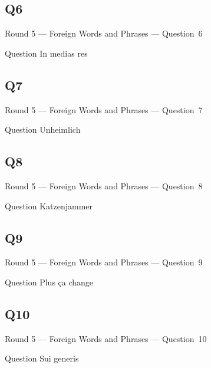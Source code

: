 \documentclass[11pt]{beamer}
\begin{document}
\subsection*{Q6}
\begin{frame}[t]{Round 5 --- Foreign Words and Phrases --- \mbox{Question 6}}
    \vspace{-0.5em}
    \begin{block}{Question}
        In medias res
    \end{block}
\end{frame}
\subsection*{Q7}
\begin{frame}[t]{Round 5 --- Foreign Words and Phrases --- \mbox{Question 7}}
    \vspace{-0.5em}
    \begin{block}{Question}
        Unheimlich
    \end{block}
\end{frame}
\subsection*{Q8}
\begin{frame}[t]{Round 5 --- Foreign Words and Phrases --- \mbox{Question 8}}
    \vspace{-0.5em}
    \begin{block}{Question}
        Katzenjammer
    \end{block}
\end{frame}
\subsection*{Q9}
\begin{frame}[t]{Round 5 --- Foreign Words and Phrases --- \mbox{Question 9}}
    \vspace{-0.5em}
    \begin{block}{Question}
        Plus ça change
    \end{block}
\end{frame}
\subsection*{Q10}
\begin{frame}[t]{Round 5 --- Foreign Words and Phrases --- \mbox{Question 10}}
    \vspace{-0.5em}
    \begin{block}{Question}
        Sui generis
    \end{block}
\end{frame}
\end{document}
